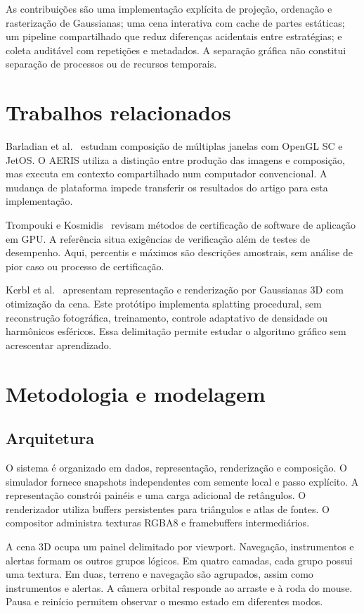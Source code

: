 \documentclass[conference]{IEEEtran}
\begin{document}
As contribuições são uma implementação explícita de projeção, ordenação e rasterização de Gaussianas; uma cena interativa com cache de partes estáticas; um pipeline compartilhado que reduz diferenças acidentais entre estratégias; e coleta auditável com repetições e metadados. A separação gráfica não constitui separação de processos ou de recursos temporais.

\section{Trabalhos relacionados}
Barladian et al.~\cite{barladian} estudam composição de múltiplas janelas com OpenGL SC e JetOS. O AERIS utiliza a distinção entre produção das imagens e composição, mas executa em contexto compartilhado num computador convencional. A mudança de plataforma impede transferir os resultados do artigo para esta implementação.

Trompouki e Kosmidis~\cite{trompouki} revisam métodos de certificação de software de aplicação em GPU. A referência situa exigências de verificação além de testes de desempenho. Aqui, percentis e máximos são descrições amostrais, sem análise de pior caso ou processo de certificação.

Kerbl et al.~\cite{kerbl} apresentam representação e renderização por Gaussianas 3D com otimização da cena. Este protótipo implementa splatting procedural, sem reconstrução fotográfica, treinamento, controle adaptativo de densidade ou harmônicos esféricos. Essa delimitação permite estudar o algoritmo gráfico sem acrescentar aprendizado.

\section{Metodologia e modelagem}
\subsection{Arquitetura}
O sistema é organizado em dados, representação, renderização e composição. O simulador fornece snapshots independentes com semente local e passo explícito. A representação constrói painéis e uma carga adicional de retângulos. O renderizador utiliza buffers persistentes para triângulos e atlas de fontes. O compositor administra texturas RGBA8 e framebuffers intermediários.

A cena 3D ocupa um painel delimitado por viewport. Navegação, instrumentos e alertas formam os outros grupos lógicos. Em quatro camadas, cada grupo possui uma textura. Em duas, terreno e navegação são agrupados, assim como instrumentos e alertas. A câmera orbital responde ao arraste e à roda do mouse. Pausa e reinício permitem observar o mesmo estado em diferentes modos.
\end{document}
